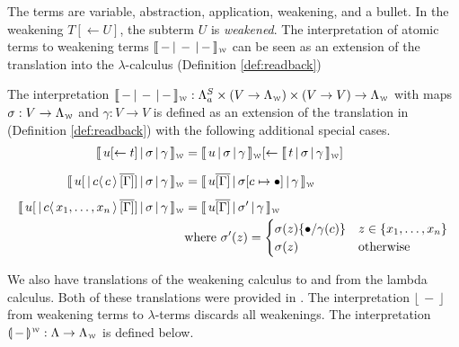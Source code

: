 \documentclass[a4paper,UKenglish,cleveref, autoref]{lipics-v2019}
\newcommand{\FALC}{\Lambda^{S}_{a}}
\newcommand{\WEAK}{\Lambda_{\weaksymbol}}
\newcommand{\set}[1]{ \{ #1 \} }
\newcommand{\share}[3]{#1 [#2 \leftarrow #3]}
\newcommand{\dist}[5]{#1 [ #2 \, \vert \, \fakedist{#4}{#5} \, #3 ]}
\newcommand{\fakedist}[2]{#1 \langle \, #2 \, \rangle}
\newcommand{\sub}[3]{#1 \{ #2 / #3 \}}
\newcommand{\weaksymbol}{\mbox{\tiny $\mathcal{W}$}}
\newcommand{\readweakwmap}[3]{\llbracket \, #1 \, \vert \, #2 \, \vert \, #3  \, \rrbracket_{\weaksymbol} }
\newcommand{\compweak}[1]{\llparenthesis \, #1 \, \rrparenthesis^{\weaksymbol}}
\newcommand{\readbackweak}[1]{\lfloor \, #1 \, \rfloor}
\begin{document}
The terms are variable, abstraction, application, weakening, and a bullet. In the weakening $\share{T}{}{U}$, the subterm $U$ is \emph{weakened}. The interpretation of atomic terms to weakening terms $\readweakwmap{-}{-}{-}$ can be seen as an extension of the translation into the $\lambda$-calculus (Definition \ref{def:readback})

\begin{definition}
\label{def:transfalcweak}
	The interpretation $\readweakwmap{-}{-}{-} : \FALC \times (V \rightarrow \WEAK) \times (V \rightarrow V) \rightarrow \WEAK$ with maps $\sigma : V \rightarrow \WEAK$ and $\gamma : V \rightarrow V$ is defined as an extension of the translation in (Definition \ref{def:readback}) with the following additional special cases.
	\begin{align*}
		\readweakwmap{\share{u}{}{t}}{\sigma}{\gamma} &= \share{\readweakwmap{u}{\sigma}{\gamma}}{}{\readweakwmap{t}{\sigma}{\gamma}} \\[0.2cm]
		\readweakwmap{\dist{u}{}{\overline{[\Gamma]}}{c}{c}}{\sigma}{\gamma} &= \readweakwmap{u \overline{[\Gamma]}}{\sigma[c \mapsto \bullet]}{\gamma} \\[0.2cm]
		\readweakwmap{\dist{u}{}{\overline{[\Gamma]}}{c}{x_{1}, \dots, x_{n}}}{\sigma}{\gamma} &= \readweakwmap{u \overline{[\Gamma]}}{\sigma'}{\gamma} \\
		& \text{where } \sigma'(z) = \begin{cases} \sigma(z) \sub{}{\bullet}{\gamma(c)} & z \in \set{x_{1}, \dots, x_{n}} \\ \sigma(z) & \text{otherwise} \end{cases} \\
	\end{align*}
\end{definition}

\noindent We also have translations of the weakening calculus to and from the lambda calculus. Both of these translations were provided in  \cite{gundersen2013atomic}. The interpretation $\readbackweak{-}$ from weakening terms to $\lambda$-terms discards all weakenings. The interpretation $\compweak{-} : \Lambda \rightarrow \WEAK$ is defined below.
\end{document}
